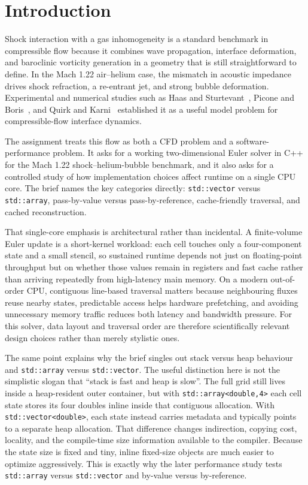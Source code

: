 \documentclass[final,3p,times,twocolumn]{elsarticle}
\begin{document}
\section{Introduction}

Shock interaction with a gas inhomogeneity is a standard benchmark in compressible flow because it combines wave propagation, interface deformation, and baroclinic vorticity generation in a geometry that is still straightforward to define. In the Mach 1.22 air--helium case, the mismatch in acoustic impedance drives shock refraction, a re-entrant jet, and strong bubble deformation. Experimental and numerical studies such as Haas and Sturtevant~\cite{haas1987}, Picone and Boris~\cite{picone1988}, and Quirk and Karni~\cite{quirk1996} established it as a useful model problem for compressible-flow interface dynamics.

The assignment treats this flow as both a CFD problem and a software-performance problem. It asks for a working two-dimensional Euler solver in C++ for the Mach 1.22 shock--helium-bubble benchmark, and it also asks for a controlled study of how implementation choices affect runtime on a single CPU core. The brief names the key categories directly: \texttt{std::vector} versus \texttt{std::array}, pass-by-value versus pass-by-reference, cache-friendly traversal, and cached reconstruction.

That single-core emphasis is architectural rather than incidental. A finite-volume Euler update is a short-kernel workload: each cell touches only a four-component state and a small stencil, so sustained runtime depends not just on floating-point throughput but on whether those values remain in registers and fast cache rather than arriving repeatedly from high-latency main memory. On a modern out-of-order CPU, contiguous line-based traversal matters because neighbouring fluxes reuse nearby states, predictable access helps hardware prefetching, and avoiding unnecessary memory traffic reduces both latency and bandwidth pressure. For this solver, data layout and traversal order are therefore scientifically relevant design choices rather than merely stylistic ones.

The same point explains why the brief singles out stack versus heap behaviour and \texttt{std::array} versus \texttt{std::vector}. The useful distinction here is not the simplistic slogan that ``stack is fast and heap is slow''. The full grid still lives inside a heap-resident outer container, but with \texttt{std::array<double,4>} each cell state stores its four doubles inline inside that contiguous allocation. With \texttt{std::vector<double>}, each state instead carries metadata and typically points to a separate heap allocation. That difference changes indirection, copying cost, locality, and the compile-time size information available to the compiler. Because the state size is fixed and tiny, inline fixed-size objects are much easier to optimize aggressively. This is exactly why the later performance study tests \texttt{std::array} versus \texttt{std::vector} and by-value versus by-reference.
\end{document}
